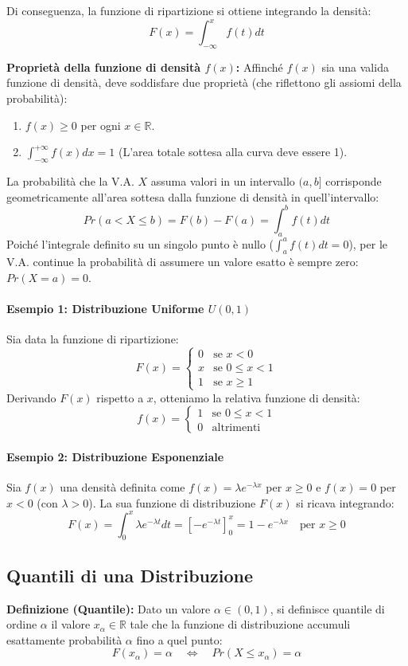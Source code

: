 \documentclass[12pt, a4paper]{article}
\begin{document}
Di conseguenza, la funzione di ripartizione si ottiene integrando la densità:
$$ F(x) = \int_{-\infty}^{x} f(t) dt $$

\textbf{Proprietà della funzione di densità $f(x)$:}
Affinché $f(x)$ sia una valida funzione di densità, deve soddisfare due proprietà (che riflettono gli assiomi della probabilità):
\begin{enumerate}
    \item $f(x) \ge 0$ per ogni $x \in \mathbb{R}$.
    \item $\int_{-\infty}^{+\infty} f(x) dx = 1$ (L'area totale sottesa alla curva deve essere 1).
\end{enumerate}

La probabilità che la V.A. $X$ assuma valori in un intervallo $(a, b]$ corrisponde geometricamente all'area sottesa dalla funzione di densità in quell'intervallo:
$$ Pr(a < X \le b) = F(b) - F(a) = \int_a^b f(t) dt $$
Poiché l'integrale definito su un singolo punto è nullo ($\int_a^a f(t)dt = 0$), per le V.A. continue la probabilità di assumere un valore esatto è sempre zero: $Pr(X=a) = 0$.

\paragraph{Esempio 1: Distribuzione Uniforme $U(0,1)$}
Sia data la funzione di ripartizione:
$$
F(x) = 
\begin{cases} 
0 & \text{se } x < 0 \\
x & \text{se } 0 \le x < 1 \\
1 & \text{se } x \ge 1
\end{cases}
$$
Derivando $F(x)$ rispetto a $x$, otteniamo la relativa funzione di densità:
$$
f(x) = 
\begin{cases} 
1 & \text{se } 0 \le x < 1 \\
0 & \text{altrimenti}
\end{cases}
$$

\paragraph{Esempio 2: Distribuzione Esponenziale}
Sia $f(x)$ una densità definita come $f(x) = \lambda e^{-\lambda x}$ per $x \ge 0$ e $f(x)=0$ per $x < 0$ (con $\lambda > 0$). La sua funzione di distribuzione $F(x)$ si ricava integrando:
$$ F(x) = \int_0^x \lambda e^{-\lambda t} dt = \left[ -e^{-\lambda t} \right]_0^x = 1 - e^{-\lambda x} \quad \text{per } x \ge 0 $$

\subsection{Quantili di una Distribuzione}
\textbf{Definizione (Quantile):} Dato un valore $\alpha \in (0, 1)$, si definisce quantile di ordine $\alpha$ il valore $x_\alpha \in \mathbb{R}$ tale che la funzione di distribuzione accumuli esattamente probabilità $\alpha$ fino a quel punto:
$$ F(x_\alpha) = \alpha \quad \iff \quad Pr(X \le x_\alpha) = \alpha $$
\end{document}
